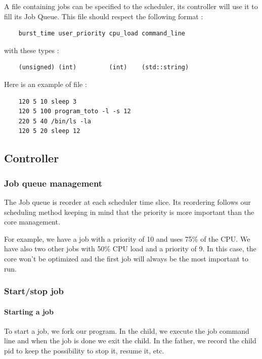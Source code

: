 \documentclass[a4paper,11pt]{article}
\begin{document}
A file containing jobs can be specified to the scheduler, its controller will use it to fill its Job Queue. This file should respect the following format :

\begin{verbatim}
    burst_time user_priority cpu_load command_line
\end{verbatim}

with these types :

\begin{verbatim}
    (unsigned) (int)         (int)    (std::string)
\end{verbatim}

Here is an example of file :

\begin{verbatim}
    120 5 10 sleep 3
    120 5 100 program_toto -l -s 12
    220 5 40 /bin/ls -la
    120 5 20 sleep 12
\end{verbatim}

\subsection{Controller}\label{job_controller}

\subsubsection{Job queue management}

The Job queue is reorder at each scheduler time slice. Its reordering follows our scheduling method keeping in mind that
the priority is more important than the core management. 

For example, we have a job with a priority of 10 and uses 75\% of the CPU. We have also two other jobs with 50\% CPU load and
a priority of 9. In this case, the core won't be optimized and the first job will always be the most important to run.

\subsubsection{Start/stop job}

\paragraph{Starting a job}
To start a job, we fork our program. In the child, we execute the job command line and when the job is done we exit the child.
In the father,  we record the child pid to keep the possibility to stop it, resume it, etc.
\end{document}

